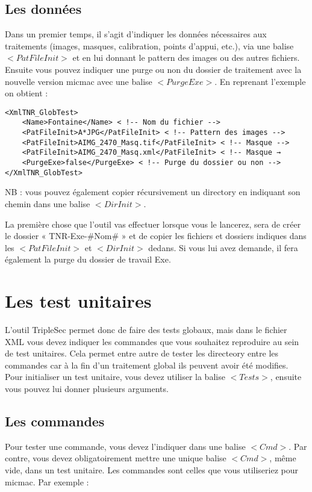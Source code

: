\documentclass[a4paper]{book}
\begin{document}
\subsection{Les donn\'ees}
Dans un premier temps, il s'agit d'indiquer les donn\'ees n\'ecessaires aux traitements (images, masques, calibration, points d'appui, etc.), via une balise $<PatFileInit>$ et en lui donnant le pattern des images ou des autres fichiers. Ensuite vous pouvez indiquer une purge ou non du dossier de traitement avec la nouvelle version micmac avec une balise $<PurgeExe>$. En reprenant l'exemple on obtient :

\begin{verbatim}
<XmlTNR_GlobTest>
	<Name>Fontaine</Name> < !-- Nom du fichier -->
	<PatFileInit>A*JPG</PatFileInit> < !-- Pattern des images -->
	<PatFileInit>AIMG_2470_Masq.tif</PatFileInit> < !-- Masque -->
	<PatFileInit>AIMG_2470_Masq.xml</PatFileInit> < !-- Masque →
	<PurgeExe>false</PurgeExe> < !-- Purge du dossier ou non -->
</XmlTNR_GlobTest>
\end{verbatim}

NB : vous pouvez \'egalement copier r\'ecursivement un directory en indiquant son chemin dans une balise $<DirInit>$.

La première chose que l'outil vas effectuer lorsque vous le lancerez, sera de cr\'eer le dossier « TNR-Exe-\#Nom\# » et de copier les fichiers et dossiers indiques dans les $<PatFileInit>$ et $<DirInit>$ dedans. Si vous lui avez demande, il fera \'egalement la purge du dossier de travail Exe.

\section{Les test unitaires}
L'outil TripleSec permet donc de faire des tests globaux, mais dans le fichier XML vous devez indiquer les commandes que vous souhaitez reproduire au sein de test unitaires. Cela permet entre autre de tester les directeory entre les commandes car à la fin d'un traitement global ils peuvent avoir \'et\'e modifies. Pour initialiser un test unitaire, vous devez utiliser la balise $<Tests>$, ensuite vous pouvez lui donner plusieurs arguments.

\subsection{Les commandes}
Pour tester une commande, vous devez l'indiquer dans une balise $<Cmd>$. Par contre, vous devez obligatoirement mettre une unique balise $<Cmd>$, m\^eme vide, dans un test unitaire. Les commandes sont celles que vous utiliseriez pour micmac. Par exemple :
\end{document}
